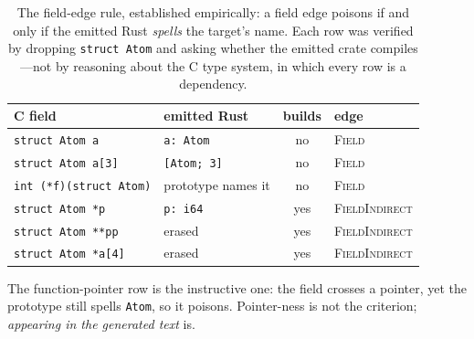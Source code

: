 \begin{table}[t]
\centering
\footnotesize
\caption{The field-edge rule, established empirically: a field edge poisons
if and only if the emitted Rust \emph{spells} the target's name. Each row was
verified by dropping \texttt{struct Atom} and asking whether the emitted crate
compiles---not by reasoning about the C type system, in which every row is a
dependency.}
\label{tab:field}
\begin{tabular}{@{}llcl@{}}
\toprule
\textbf{C field} & \textbf{emitted Rust} & \textbf{builds} & \textbf{edge} \\
\midrule
\texttt{struct Atom a}       & \texttt{a: Atom}     & no  & \textsc{Field} \\
\texttt{struct Atom a[3]}    & \texttt{[Atom; 3]}   & no  & \textsc{Field} \\
\texttt{int (*f)(struct Atom)} & prototype names it & no  & \textsc{Field} \\
\texttt{struct Atom *p}      & \texttt{p: i64}      & yes & \textsc{FieldIndirect} \\
\texttt{struct Atom **pp}    & erased               & yes & \textsc{FieldIndirect} \\
\texttt{struct Atom *a[4]}   & erased               & yes & \textsc{FieldIndirect} \\
\bottomrule
\end{tabular}

\vspace{2pt}
\raggedright\scriptsize
The function-pointer row is the instructive one: the field crosses a pointer,
yet the prototype still spells \texttt{Atom}, so it poisons. Pointer-ness is
not the criterion; \emph{appearing in the generated text} is.
\end{table}
